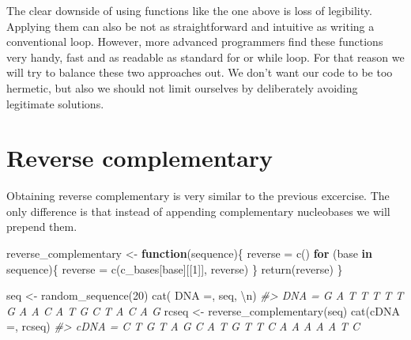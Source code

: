 \documentclass[
]{book}
\newenvironment{Shaded}{\begin{snugshade}}{\end{snugshade}}
\newcommand{\CommentTok}[1]{\textcolor[rgb]{0.56,0.35,0.01}{\textit{#1}}}
\newcommand{\ControlFlowTok}[1]{\textcolor[rgb]{0.13,0.29,0.53}{\textbf{#1}}}
\newcommand{\DecValTok}[1]{\textcolor[rgb]{0.00,0.00,0.81}{#1}}
\newcommand{\FunctionTok}[1]{\textcolor[rgb]{0.00,0.00,0.00}{#1}}
\newcommand{\NormalTok}[1]{#1}
\newcommand{\OtherTok}[1]{\textcolor[rgb]{0.56,0.35,0.01}{#1}}
\newcommand{\SpecialCharTok}[1]{\textcolor[rgb]{0.00,0.00,0.00}{#1}}
\newcommand{\StringTok}[1]{\textcolor[rgb]{0.31,0.60,0.02}{#1}}
\begin{document}
The clear downside of using functions like the one above is loss of legibility. Applying them can also be not as straightforward and intuitive as writing a conventional loop. However, more advanced programmers find these functions very handy, fast and as readable as standard for or while loop. For that reason we will try to balance these two approaches out. We don't want our code to be too hermetic, but also we should not limit ourselves by deliberately avoiding legitimate solutions.

\hypertarget{reverse-complementary}{%
\section{Reverse complementary}\label{reverse-complementary}}

Obtaining reverse complementary is very similar to the previous excercise. The only difference is that instead of appending complementary nucleobases we will prepend them.

\begin{Shaded}
\begin{Highlighting}[]
\NormalTok{reverse\_complementary }\OtherTok{\textless{}{-}} \ControlFlowTok{function}\NormalTok{(sequence)\{}
\NormalTok{  reverse }\OtherTok{=} \FunctionTok{c}\NormalTok{()}
  \ControlFlowTok{for}\NormalTok{ (base }\ControlFlowTok{in}\NormalTok{ sequence)\{}
\NormalTok{    reverse }\OtherTok{=} \FunctionTok{c}\NormalTok{(c\_bases[base][[}\DecValTok{1}\NormalTok{]], reverse)}
\NormalTok{  \}}
  \FunctionTok{return}\NormalTok{(reverse)}
\NormalTok{\}}
\end{Highlighting}
\end{Shaded}

\begin{Shaded}
\begin{Highlighting}[]
\NormalTok{seq }\OtherTok{\textless{}{-}} \FunctionTok{random\_sequence}\NormalTok{(}\DecValTok{20}\NormalTok{)}
\FunctionTok{cat}\NormalTok{(}\StringTok{\textquotesingle{} DNA =\textquotesingle{}}\NormalTok{, seq, }\StringTok{\textquotesingle{}}\SpecialCharTok{\textbackslash{}n}\StringTok{\textquotesingle{}}\NormalTok{)}
\CommentTok{\#\textgreater{}  DNA = G A T T T T T G A A C A T G C T A C A G}
\NormalTok{rcseq }\OtherTok{\textless{}{-}} \FunctionTok{reverse\_complementary}\NormalTok{(seq)}
\FunctionTok{cat}\NormalTok{(}\StringTok{\textquotesingle{}cDNA =\textquotesingle{}}\NormalTok{, rcseq)}
\CommentTok{\#\textgreater{} cDNA = C T G T A G C A T G T T C A A A A A T C}
\end{Highlighting}
\end{Shaded}
\end{document}
